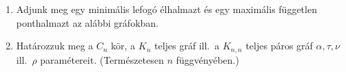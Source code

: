 \documentclass[a4paper, 12pt]{article}
\begin{document}
\begin{enumerate}

\item Adjunk meg egy minimális lefogó élhalmazt és egy maximális független ponthalmazt az alábbi gráfokban.
	\begin{figure}[h]
	\centering
	\begin{subfigure}[b]{0.45\textwidth}
		\centering
		
	\end{subfigure}
	\begin{subfigure}[b]{0.45\textwidth}
		\centering
		
	\end{subfigure}
	\end{figure}

\item Határozzuk meg a $C_n$ kör, a $K_n$ teljes gráf ill.\ a $K_{n,n}$ teljes páros gráf $\alpha, \tau, \nu$ ill.\ $\rho$ paramétereit. (Természetesen $n$ függvényében.) 


\end{enumerate}
\end{document}
